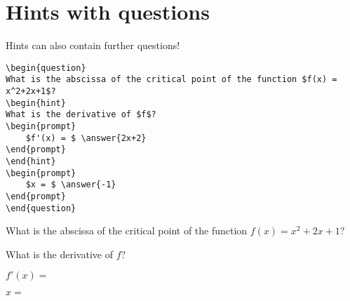 \documentclass{ximera}
\begin{document}
\section{Hints with questions}

Hints can also contain further questions! 

\begin{verbatim}
\begin{question}
What is the abscissa of the critical point of the function $f(x) = x^2+2x+1$?
\begin{hint}
What is the derivative of $f$?
\begin{prompt}
	$f'(x) = $ \answer{2x+2}
\end{prompt}
\end{hint}
\begin{prompt}
	$x = $ \answer{-1}
\end{prompt}
\end{question}
\end{verbatim}

\begin{question}
What is the abscissa of the critical point of the function $f(x) = x^2+2x+1$?
\begin{hint}
	What is the derivative of $f$?
	\begin{prompt}
		$f'(x) = $ 
	\end{prompt}
\end{hint}
\begin{prompt}
	$x = $ \answer{-1}
\end{prompt}
\end{question}
\end{document}

